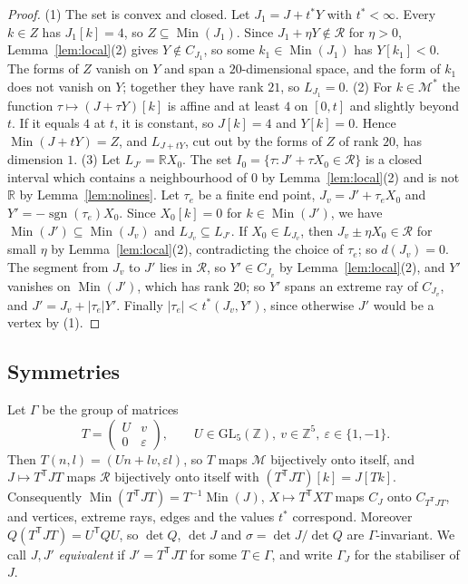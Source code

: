 \documentclass[11pt]{amsart}
\theoremstyle{definition}
\theoremstyle{remark}
\numberwithin{equation}{section}
\numberwithin{table}{section}
\numberwithin{figure}{section}
\newcommand{\R}{\mathbb{R}}
\newcommand{\Z}{\mathbb{Z}}
\newcommand{\M}{\mathcal{M}}
\newcommand{\Rk}{\mathcal{R}}
\newcommand{\Min}{\operatorname{Min}}
\newcommand{\GL}{\mathrm{GL}}
\newcommand{\T}{\mathsf{T}}
\begin{document}
\begin{proof}
(1) The set is convex and closed. Let $J_1=J+t^*Y$ with $t^*<\infty$. Every $k\in Z$ has $J_1[k]=4$, so $Z\subseteq\Min(J_1)$. Since $J_1+\eta Y\notin\Rk$ for $\eta>0$, Lemma~\ref{lem:local}(2) gives $Y\notin C_{J_1}$, so some $k_1\in\Min(J_1)$ has $Y[k_1]<0$. The forms of $Z$ vanish on $Y$ and span a $20$-dimensional space, and the form of $k_1$ does not vanish on $Y$; together they have rank $21$, so $L_{J_1}=0$.
(2) For $k\in\M^*$ the function $\tau\mapsto(J+\tau Y)[k]$ is affine and at least $4$ on $[0,t]$ and slightly beyond $t$. If it equals $4$ at $t$, it is constant, so $J[k]=4$ and $Y[k]=0$. Hence $\Min(J+tY)=Z$, and $L_{J+tY}$, cut out by the forms of $Z$ of rank $20$, has dimension $1$.
(3) Let $L_{J'}=\R X_0$. The set $I_0=\{\tau:J'+\tau X_0\in\Rk\}$ is a closed interval which contains a neighbourhood of $0$ by Lemma~\ref{lem:local}(2) and is not $\R$ by Lemma~\ref{lem:nolines}. Let $\tau_e$ be a finite end point, $J_v=J'+\tau_eX_0$ and $Y'=-\operatorname{sgn}(\tau_e)X_0$. Since $X_0[k]=0$ for $k\in\Min(J')$, we have $\Min(J')\subseteq\Min(J_v)$ and $L_{J_v}\subseteq L_{J'}$. If $X_0\in L_{J_v}$, then $J_v\pm\eta X_0\in\Rk$ for small $\eta$ by Lemma~\ref{lem:local}(2), contradicting the choice of $\tau_e$; so $d(J_v)=0$. The segment from $J_v$ to $J'$ lies in $\Rk$, so $Y'\in C_{J_v}$ by Lemma~\ref{lem:local}(2), and $Y'$ vanishes on $\Min(J')$, which has rank $20$; so $Y'$ spans an extreme ray of $C_{J_v}$, and $J'=J_v+|\tau_e|Y'$. Finally $|\tau_e|<t^*(J_v,Y')$, since otherwise $J'$ would be a vertex by (1).
\end{proof}

\subsection{Symmetries}\label{ssec:symmetries}
Let $\Gamma$ be the group of matrices
\[
T=\begin{pmatrix}U&v\\0&\varepsilon\end{pmatrix},\qquad U\in\GL_5(\Z),\ v\in\Z^5,\ \varepsilon\in\{1,-1\}.
\]
Then $T(n,l)=(Un+lv,\varepsilon l)$, so $T$ maps $\M$ bijectively onto itself, and $J\mapsto T^\T JT$ maps $\Rk$ bijectively onto itself with $(T^\T JT)[k]=J[Tk]$. Consequently $\Min(T^\T JT)=T^{-1}\Min(J)$, $X\mapsto T^\T XT$ maps $C_J$ onto $C_{T^\T JT}$, and vertices, extreme rays, edges and the values $t^*$ correspond. Moreover $Q(T^\T JT)=U^\T QU$, so $\det Q$, $\det J$ and $\sigma=\det J/\det Q$ are $\Gamma$-invariant. We call $J,J'$ \emph{equivalent} if $J'=T^\T JT$ for some $T\in\Gamma$, and write $\Gamma_J$ for the stabiliser of $J$.
\end{document}
